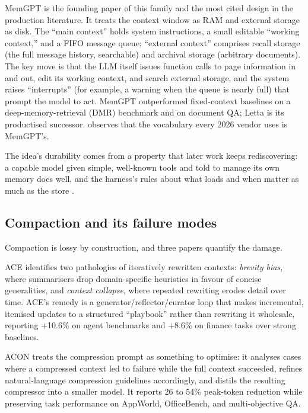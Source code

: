\documentclass[11pt]{article}
\begin{document}
MemGPT \citep{packer2023memgpt} is the founding paper of this family and the most cited design in the production literature. It treats the context window as RAM and external storage as disk. The ``main context'' holds system instructions, a small editable ``working context,'' and a FIFO message queue; ``external context'' comprises recall storage (the full message history, searchable) and archival storage (arbitrary documents). The key move is that the LLM itself issues function calls to page information in and out, edit its working context, and search external storage, and the system raises ``interrupts'' (for example, a warning when the queue is nearly full) that prompt the model to act. MemGPT outperformed fixed-context baselines on a deep-memory-retrieval (DMR) benchmark and on document QA; Letta is its productised successor. \citet{kumar2026agentmemory} observes that the vocabulary every 2026 vendor uses is MemGPT's.

The idea's durability comes from a property that later work keeps rediscovering: a capable model given simple, well-known tools and told to manage its own memory does well, and the harness's rules about what loads and when matter as much as the store \citep{letta2025filesystem,wooders2026plugin}.

\subsection{Compaction and its failure modes}

Compaction is lossy by construction, and three papers quantify the damage.

ACE \citep{zhang2025ace} identifies two pathologies of iteratively rewritten contexts: \emph{brevity bias}, where summarisers drop domain-specific heuristics in favour of concise generalities, and \emph{context collapse}, where repeated rewriting erodes detail over time. ACE's remedy is a generator/reflector/curator loop that makes incremental, itemised updates to a structured ``playbook'' rather than rewriting it wholesale, reporting +10.6\% on agent benchmarks and +8.6\% on finance tasks over strong baselines.

ACON \citep{kang2025acon} treats the compression prompt as something to optimise: it analyses cases where a compressed context led to failure while the full context succeeded, refines natural-language compression guidelines accordingly, and distils the resulting compressor into a smaller model. It reports 26 to 54\% peak-token reduction while preserving task performance on AppWorld, OfficeBench, and multi-objective QA.
\end{document}
